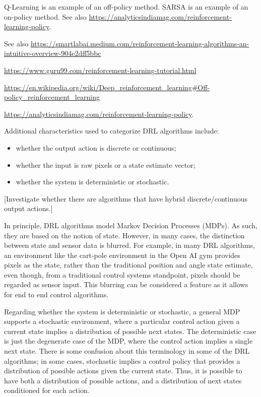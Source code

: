 \documentclass[acmlarge,screen]{acmart}
\begin{document}
Q-Learning is an example of an off-policy method.
SARSA is an example of an on-policy method.
See also \url{https://analyticsindiamag.com/reinforcement-learning-policy}.


\noindent See also 
\url{https://smartlabai.medium.com/reinforcement-learning-algorithms-an-intuitive-overview-904e2dff5bbc}

\url{https://www.guru99.com/reinforcement-learning-tutorial.html}

\url{https://en.wikipedia.org/wiki/Deep_reinforcement_learning#Off-policy_reinforcement_learning}

\url{https://analyticsindiamag.com/reinforcement-learning-policy}.


Additional characteristics used to categorize DRL algorithms include:

\begin{itemize}
\item whether the output action is discrete or continuous;
\item whether the input is raw pixels or a state estimate vector;
\item whether the system is deterministic or stochastic.
\end{itemize} 

[Investigate whether there are algorithms that have hybrid discrete/continuous output actions.]

In principle, DRL algorithms model Markov Decision Processes (MDPs).
As such, they are based on the notion of state.
However, in many cases, the distinction between state and sensor data is blurred.
For example, in many DRL algorithms, an environment like the cart-pole environment in the Open AI gym 
provides pixels as the state, rather than the traditional position and angle state estimate, even
though, from a traditional control systems standpoint, pixels should be regarded as sensor input.
This blurring can be considered a feature as it allows for end to end control algorithms.

Regarding whether the system is deterministic or stochastic, a general MDP supports a stochastic environment,
where a particular control action given a current state implies a distribution of possible next states.
The deterministic case is just the degenerate case of the MDP, where the control action implies a single next state.
There is some confusion about this terminology in some of the DRL algorithms;  in some cases, stochastic
implies a control policy that provides a distribution of possible actions given the current state.
Thus, it is possible to have both a distribution of possible actions, and a distribution of next states
conditioned for each action.
\end{document}
